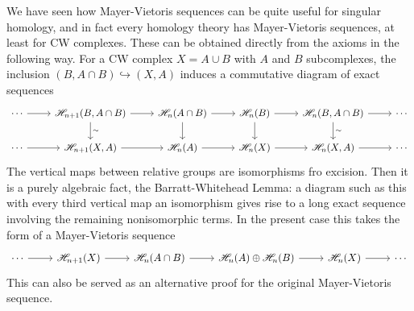 We have seen how Mayer-Vietoris sequences can be quite useful for singular homology, and in fact every homology theory has Mayer-Vietoris sequences, at least for CW complexes. These can be obtained directly from the axioms in the following way. For a CW complex $X=A\cup B$ with $A$ and $B$ subcomplexes, the inclusion $(B,A\cap B)\hookrightarrow(X,A)$ induces a commutative diagram of exact sequences
\[\begin{tikzcd}
\cdots\ar[r]&\mathscr{H}_{n+1}(B,A\cap B)\ar[d,"\sim"]\ar[r]&\mathscr{H}_n(A\cap B)\ar[d]\ar[r]&\mathscr{H}_n(B)\ar[d]\ar[r]&\mathscr{H}_n(B,A\cap B)\ar[d,"\sim"]\ar[r]&\cdots\\
\cdots\ar[r]&\mathscr{H}_{n+1}(X,A)\ar[r]&\mathscr{H}_n(A)\ar[r]&\mathscr{H}_n(X)\ar[r]&\mathscr{H}_n(X,A)\ar[r]&\cdots
\end{tikzcd}\]
The vertical maps between relative groups are isomorphisms fro excision. Then it is a purely algebraic fact, the Barratt-Whitehead Lemma: a diagram such as this with every third vertical map an isomorphism gives rise to a long exact sequence involving the remaining nonisomorphic terms. In the present case this takes the form of a Mayer-Vietoris sequence
\[\begin{tikzcd}
\cdots\ar[r]&\mathscr{H}_{n+1}(X)\ar[r]&\mathscr{H}_n(A\cap B)\ar[r]&\mathscr{H}_n(A)\oplus\mathscr{H}_n(B)\ar[r]&\mathscr{H}_n(X)\ar[r]&\cdots
\end{tikzcd}\]
This can also be served as an alternative proof for the original Mayer-Vietoris sequence.
